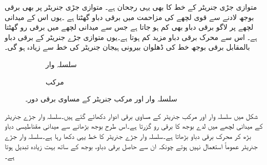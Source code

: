 متوازی جڑی جنریٹر کے خط کا بھی یہی رجحان ہے۔ متوازی جڑی جنریٹر پر بھی برقی بوجھ لادنے سے قوی لچھے کی مزاحمت میں برقی دباو گھٹتا ہے ۔یوں اس کے میدانی لچھے پر لاگو برقی دباو بھی کم ہو جاتا ہے جس سے میدانی لچھے میں برقی رو گھٹتا ہے۔ اس سے محرک برقی دباو مزید کم ہوتا ہے۔یوں متوازی جڑے جنریٹر کے برقی دباو بالمقابل برقی بوجھ  خط کی ڈھلوان بیرونی ہیجان جنریٹر کی خط سے زیادہ ہو گی۔
\begin{figure}
\centering
\begin{subfigure}{0.40\textwidth}
\centering
{}
\caption{سلسلہ وار}
\end{subfigure}\hfill
\begin{subfigure}{0.50\textwidth}
\centering
{}
\caption{مرکب}
\end{subfigure}
\caption{سلسلہ وار اور مرکب جنریٹر کے مساوی برقی دور۔}
\label{شکل_یکسمتی_سلسلہ_وار_اور_مرکب_مساوی}
\end{figure}

شکل   میں سلسلہ وار اور مرکب جنریٹر کے مساوی برقی ادوار دکھائے گئے ہیں۔سلسلہ وار جڑے جنریٹر کے میدانی لچھے میں لدے  بوجھ کا برقی رو  گزرتا ہے۔اس طرح بوجھ بڑھانے سے میدانی مقناطیسی دباو  بڑھ کر محرک برقی دباو بڑھاتا ہے۔سلسلہ وار جڑے جنریٹر کا خط یہی دکھا رہا ہے۔سلسلہ وار جڑے جنریٹر عموماً استعمال نہیں ہوتے چونکہ ان سے حاصل برقی دباو، بوجھ کے ساتھ بہت زیادہ تبدیل ہوتا ہے۔ 

